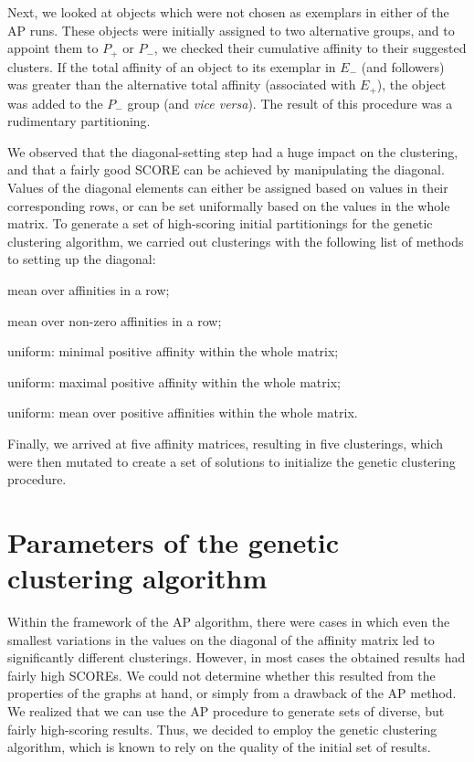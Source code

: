 \documentclass[a4paper,11pt,twoside]{book}%
\begin{document}
\begin{appendices}
Next, we looked at objects which were not chosen as exemplars in either of the AP runs.
These objects were initially assigned to two alternative groups, and to appoint them to $P_+$ or $P_-$, we checked their cumulative affinity to their suggested clusters.
If the total affinity of an object to its exemplar in $E_-$ (and followers) was greater than the alternative total affinity (associated with $E_+$), the object was added to the $P_-$ group (and \emph{vice versa}).
The result of this procedure was a rudimentary partitioning.

We observed that the diagonal-setting step had a huge impact on the clustering, and that a fairly good SCORE can be achieved by manipulating the diagonal.
Values of the diagonal elements can either be assigned based on values in their corresponding rows, or can be set uniformally based on the values in the whole matrix.
To generate a set of high-scoring initial partitionings for the genetic clustering algorithm, we carried out clusterings with the following list of methods to setting up the diagonal:
\begin{packeditemize}
 \item mean over affinities in a row;
 \item mean over non-zero affinities in a row;
 \item uniform: minimal positive affinity within the whole matrix;
 \item uniform: maximal positive affinity within the whole matrix;
 \item uniform: mean over positive affinities within the whole matrix.
\end{packeditemize}

Finally, we arrived at five affinity matrices, resulting in five clusterings, which were then mutated to create a set of solutions to initialize the genetic clustering procedure.

\section{Parameters of the genetic clustering algorithm}\label{sec:bootstrapping}

Within the framework of the AP algorithm, there were cases in which even the smallest variations in the values on the diagonal of the affinity matrix led to significantly different clusterings.
However, in most cases the obtained results had fairly high SCOREs. We could not determine whether this resulted from the properties of the graphs at hand, or simply from a drawback of the AP method.
We realized that we can use the AP procedure to generate sets of diverse, but fairly high-scoring results.
Thus, we decided to employ the genetic clustering algorithm, which is known to rely on the quality of the initial set of results.


\end{appendices}
\end{document}
